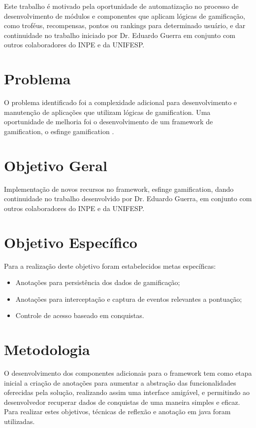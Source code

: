 \par Este trabalho é motivado pela oportunidade de automatização no processo de desenvolvimento de módulos e componentes que aplicam lógicas de gamificação, como troféus, recompensas, pontos ou rankings para determinado usuário, e dar continuidade no trabalho iniciado por Dr. Eduardo Guerra em conjunto com outros colaboradores do INPE e da UNIFESP.

\section{Problema}

\par O problema identificado foi a complexidade adicional para desenvolvimento e manutenção de aplicações que utilizam lógicas de gamification. Uma oportunidade de melhoria foi o desenvolvimento de um framework de gamification, o esfinge gamification \cite{guerra2017approach}.

\section{Objetivo Geral}

\par Implementação de novos recursos no framework, esfinge gamification, dando continuidade no trabalho desenvolvido por Dr. Eduardo Guerra, em conjunto com outros colaboradores do INPE e da UNIFESP. 

\section{Objetivo Espec\'ifico}

\par Para a realização deste objetivo foram estabelecidos metas específicas:
\begin{itemize}
    \item Anotações para persistência dos dados de gamificação;
    \item Anotações para interceptação e captura de eventos relevantes a pontuação;
    \item Controle de acesso baseado em conquistas.
\end{itemize}

\section{Metodologia}

\par O desenvolvimento dos componentes adicionais para o framework tem como etapa inicial a criação de anotações para aumentar a abstração das funcionalidades oferecidas pela solução, realizando assim uma interface amigável, e permitindo ao desenvolvedor recuperar dados de conquistas de uma maneira simples e eficaz. Para realizar estes objetivos, técnicas de reflexão e anotação em java foram utilizadas.